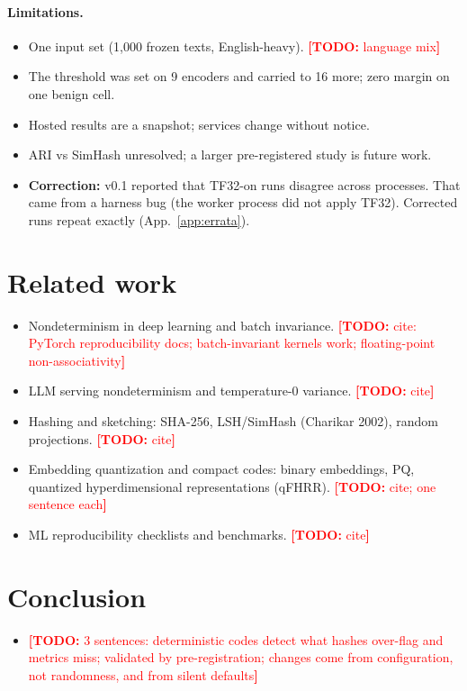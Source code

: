 \documentclass{article}
\newcommand{\todo}[1]{\textcolor{red}{\textbf{[TODO:} #1\textbf{]}}}
\begin{document}
\paragraph{Limitations.}
\begin{itemize}
  \item One input set (1,000 frozen texts, English-heavy). \todo{language mix}
  \item The threshold was set on 9 encoders and carried to 16 more; zero margin on one benign cell.
  \item Hosted results are a snapshot; services change without notice.
  \item ARI vs SimHash unresolved; a larger pre-registered study is future work.
  \item \textbf{Correction:} v0.1 reported that TF32-on runs disagree across processes. That came from a harness bug (the worker process did not apply TF32). Corrected runs repeat exactly (App.~\ref{app:errata}).
\end{itemize}

\section{Related work}\label{sec:related}
\begin{itemize}
  \item Nondeterminism in deep learning and batch invariance. \todo{cite: PyTorch reproducibility docs; batch-invariant kernels work; floating-point non-associativity}
  \item LLM serving nondeterminism and temperature-0 variance. \todo{cite}
  \item Hashing and sketching: SHA-256, LSH/SimHash (Charikar 2002), random projections. \todo{cite}
  \item Embedding quantization and compact codes: binary embeddings, PQ, quantized hyperdimensional representations (qFHRR). \todo{cite; one sentence each}
  \item ML reproducibility checklists and benchmarks. \todo{cite}
\end{itemize}

\section{Conclusion}
\begin{itemize}
  \item \todo{3 sentences: deterministic codes detect what hashes over-flag and metrics miss; validated by pre-registration; changes come from configuration, not randomness, and from silent defaults}
\end{itemize}
\end{document}
